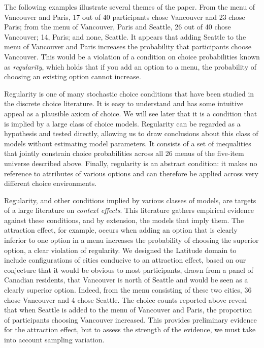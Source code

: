 \documentclass[11pt,letter]{article}
\newcommand{\menu}{menu}
\begin{document}
The following examples illustrate several themes of the paper.
From the menu of Vancouver and Paris, 17 out of 40 participants chose Vancouver and 23 chose Paris; from the menu of Vancouver, Paris and Seattle, 26 out of 40 chose Vancouver; 14, Paris; and none, Seattle.
It appears that adding Seattle to the menu of Vancouver and Paris increases the probability that participants choose Vancouver.
This would be a violation of a condition on choice probabilities known as {\em regularity}, which holds that if you add an option to a menu, the probability of choosing an existing option cannot increase.

Regularity is one of many stochastic choice conditions that have been studied in the discrete choice literature.
It is easy to understand and has some intuitive appeal as a plausible axiom of choice.
We will see later that it is a condition that is implied by a large class of choice models.
Regularity can be regarded as a hypothesis and tested directly, allowing us to draw conclusions about this class of models without estimating model parameters.
It consists of a set of inequalities that jointly constrain choice probabilities across all 26 menus of the five-item universe described above.
Finally, regularity is an abstract condition: it makes no reference to attributes of various options and can therefore be applied across very different choice environments.

Regularity, and other conditions implied by various classes of models, are targets of a large literature on {\em context effects}.
This literature gathers empirical evidence against these conditions, and by extension, the models that imply them.
The attraction effect, for example, occurs when adding an option that is clearly inferior to one option in a menu increases the probability of choosing the superior option, a clear violation of regularity.
We designed the Latitude domain to include configurations of cities conducive to an attraction effect, based on our conjecture that it would be obvious to most participants, drawn from a panel of Canadian residents, that Vancouver is north of Seattle and would be seen as a clearly superior option.
Indeed, from the \menu{} consisting of these two cities, 36 chose Vancouver and 4 chose Seattle.
The choice counts reported above reveal that when Seattle is added to the menu of Vancouver and Paris, the proportion of participants choosing Vancouver increased.
This provides preliminary evidence for the attraction effect, but to assess the strength of the evidence, we must take into account sampling variation.
\end{document}
